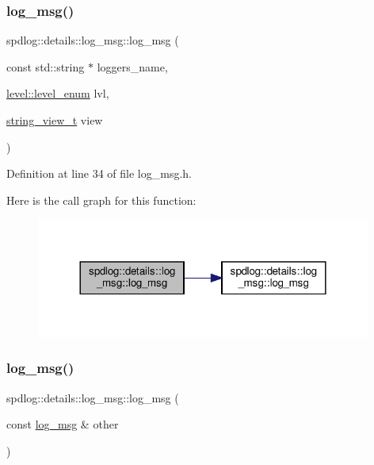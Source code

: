 \subsubsection{\texorpdfstring{log\+\_\+msg()}{log\_msg()}\hspace{0.1cm}{\footnotesize\ttfamily [2/3]}}
{\footnotesize\ttfamily spdlog\+::details\+::log\+\_\+msg\+::log\+\_\+msg (\begin{DoxyParamCaption}\item[{const std\+::string $\ast$}]{loggers\+\_\+name,  }\item[{\hyperlink{namespacespdlog_1_1level_a35f5227e5daf228d28a207b7b2aefc8b}{level\+::level\+\_\+enum}}]{lvl,  }\item[{\hyperlink{namespacespdlog_af48e310b2f366ac6544701e6a3b56247}{string\+\_\+view\+\_\+t}}]{view }\end{DoxyParamCaption})\hspace{0.3cm}{\ttfamily [inline]}}



Definition at line 34 of file log\+\_\+msg.\+h.

Here is the call graph for this function\+:
\nopagebreak
\begin{figure}[H]
\begin{center}
\leavevmode
\includegraphics[width=312pt]{structspdlog_1_1details_1_1log__msg_aed741a89e884b8f51db4fd6364402e7a_cgraph}
\end{center}
\end{figure}
\mbox{\label{structspdlog_1_1details_1_1log__msg_ad3ff125f04a5854bf78f6c359af5183a}} 
\subsubsection{\texorpdfstring{log\+\_\+msg()}{log\_msg()}\hspace{0.1cm}{\footnotesize\ttfamily [3/3]}}
{\footnotesize\ttfamily spdlog\+::details\+::log\+\_\+msg\+::log\+\_\+msg (\begin{DoxyParamCaption}\item[{const \hyperlink{structspdlog_1_1details_1_1log__msg}{log\+\_\+msg} \&}]{other }\end{DoxyParamCaption})\hspace{0.3cm}{\ttfamily [default]}}



